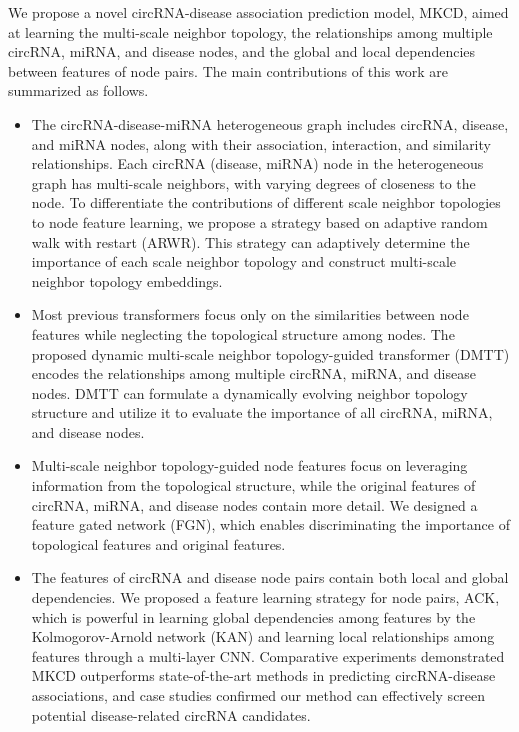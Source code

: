 \documentclass{bioinfo}
\begin{document}
\begin{methods}
We propose a novel circRNA-disease association prediction model, MKCD, aimed at learning the multi-scale neighbor topology, the relationships among multiple circRNA, miRNA, and disease nodes, and the global and local dependencies between features of node pairs. The main contributions of this work are summarized as follows.
\begin{itemize}
    \item The circRNA-disease-miRNA heterogeneous graph includes circRNA, disease, and miRNA nodes, along with their association, interaction, and similarity relationships. Each circRNA (disease, miRNA) node in the heterogeneous graph has multi-scale neighbors, with varying degrees of closeness to the node. To differentiate the contributions of different scale neighbor topologies to node feature learning, we propose a strategy based on adaptive random walk with restart (ARWR). This strategy can adaptively determine the importance of each scale neighbor topology and construct multi-scale neighbor topology embeddings.
    \item Most previous transformers focus only on the similarities between node features while neglecting the topological structure among nodes. The proposed dynamic multi-scale neighbor topology-guided transformer (DMTT) encodes the relationships among multiple circRNA, miRNA, and disease nodes. DMTT can formulate a dynamically evolving neighbor topology structure and utilize it to evaluate the importance of all circRNA, miRNA, and disease nodes.
    \item Multi-scale neighbor topology-guided node features focus on leveraging information from the topological structure, while the original features of circRNA, miRNA, and disease nodes contain more detail. We designed a feature gated network (FGN), which enables discriminating the importance of topological features and original features.
    \item The features of circRNA and disease node pairs contain both local and global dependencies. We proposed a feature learning strategy for node pairs, ACK, which is powerful in learning global dependencies among features by the Kolmogorov-Arnold network (KAN) \cite{liu2024kan} and learning local relationships among features through a multi-layer CNN. Comparative experiments demonstrated MKCD outperforms state-of-the-art methods in predicting circRNA-disease associations, and case studies confirmed our method can effectively screen potential disease-related circRNA candidates.
\end{itemize}



\end{methods}
\end{document}
